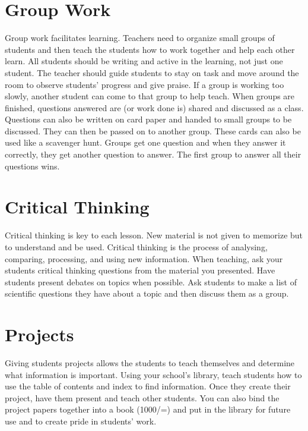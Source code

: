 \section{Group Work}
Group work facilitates learning.  Teachers need to organize small groups of students and then teach the students how to work together and help each other learn. All students should be writing and active in the learning, not just one student.  The teacher should guide students to stay on task and move around the room to observe students' progress and give praise. If a group is working too slowly, another student can come to that group to help teach.  When groups are finished, questions answered are (or work done
is) shared and discussed as a class.\\

Questions can also be written on card paper and handed to small groups to be discussed. They can then be passed on to another group.  These cards can also be used like a scavenger hunt.  Groups get one question and when they answer it correctly, they get another question to answer.  The first group to answer all their questions wins.

\section{Critical Thinking}
Critical thinking is key to each lesson.  New material is not given to memorize but to understand and be used. Critical thinking is the process of analysing, comparing, processing, and using new information. When teaching, ask your students critical thinking questions from the material you presented.  Have students present debates on topics when possible.  Ask students to make a list of scientific questions they have about a topic and then discuss them as a group.

\section{Projects}
Giving students projects allows the students to teach themselves and determine what information is important. Using your school's library, teach students how to use the table of contents and index to find information. Once they create their project, have them present and teach other students. You can also bind the project papers together into a book (1000/=) and put in the library for future use and to create pride in students' work.
